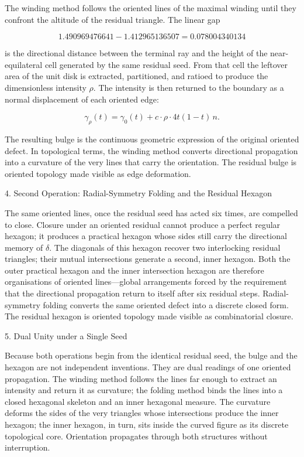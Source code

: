 The winding method follows the oriented lines of the maximal winding until they confront the altitude of the residual triangle. The linear gap

\[
1.490969476641-1.412965136507=0.078004340134
\]

is the directional distance between the terminal ray and the height of the near-equilateral cell generated by the same residual seed. From that cell the leftover area of the unit disk is extracted, partitioned, and ratioed to produce the dimensionless intensity \(\rho\). The intensity is then returned to the boundary as a normal displacement of each oriented edge:

\[
\gamma_\rho(t)=\gamma_0(t)+c\cdot\rho\cdot4t(1-t)\,n.
\]

The resulting bulge is the continuous geometric expression of the original oriented defect. In topological terms, the winding method converts directional propagation into a curvature of the very lines that carry the orientation. The residual bulge is oriented topology made visible as edge deformation.

4. Second Operation: Radial-Symmetry Folding and the Residual Hexagon

The same oriented lines, once the residual seed has acted six times, are compelled to close. Closure under an oriented residual cannot produce a perfect regular hexagon; it produces a practical hexagon whose sides still carry the directional memory of \(\delta\). The diagonals of this hexagon recover two interlocking residual triangles; their mutual intersections generate a second, inner hexagon. Both the outer practical hexagon and the inner intersection hexagon are therefore organisations of oriented lines—global arrangements forced by the requirement that the directional propagation return to itself after six residual steps. Radial-symmetry folding converts the same oriented defect into a discrete closed form. The residual hexagon is oriented topology made visible as combinatorial closure.

5. Dual Unity under a Single Seed

Because both operations begin from the identical residual seed, the bulge and the hexagon are not independent inventions. They are dual readings of one oriented propagation. The winding method follows the lines far enough to extract an intensity and return it as curvature; the folding method binds the lines into a closed hexagonal skeleton and an inner hexagonal measure. The curvature deforms the sides of the very triangles whose intersections produce the inner hexagon; the inner hexagon, in turn, sits inside the curved figure as its discrete topological core. Orientation propagates through both structures without interruption.

